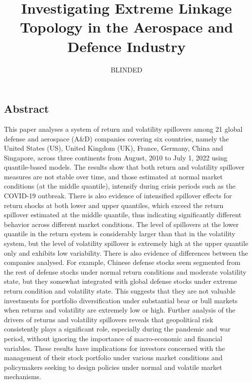 \documentclass[
  number]{elsarticle}
\begin{document}
\begin{frontmatter}
\title{Investigating Extreme Linkage Topology in the Aerospace and
Defence Industry}
\author[]{BLINDED%
%
}




        





\end{frontmatter}
    \ifdefined\Shaded\renewenvironment{Shaded}{\begin{tcolorbox}[sharp corners, enhanced, frame hidden, borderline west={3pt}{0pt}{shadecolor}, interior hidden, breakable, boxrule=0pt]}{\end{tcolorbox}}\fi

\hypertarget{abstract}{%
\subsection*{Abstract}\label{abstract}}

This paper analyses a system of return and volatility spillovers among
21 global defense and aerospace (A\&D) companies covering six countries,
namely the United States (US), United Kingdom (UK), France, Germany,
China and Singapore, across three continents from August, 2010 to July
1, 2022 using quantile-based models. The results show that both return
and volatility spillover measures are not stable over time, and those
estimated at normal market conditions (at the middle quantile),
intensify during crisis periods such as the COVID-19 outbreak. There is
also evidence of intensified spillover effects for return shocks at both
lower and upper quantiles, which exceed the return spillover estimated
at the middle quantile, thus indicating significantly different behavior
across different market conditions. The level of spillovers at the lower
quantile in the return system is considerably larger than that in the
volatility system, but the level of volatility spillover is extremely
high at the upper quantile only and exhibits low variability. There is
also evidence of differences between the companies analysed. For
example, Chinese defense stocks seem segmented from the rest of defense
stocks under normal return conditions and moderate volatility state, but
they somewhat integrated with global defense stocks under extreme return
condition and volatility state. This suggests that they are not valuable
investments for portfolio diversification under substantial bear or bull
markets when returns and volatility are extremely low or high. Further
analysis of the drivers of returns and volatility spillovers reveals
that geopolitical risk consistently plays a significant role, especially
during the pandemic and war period, without ignoring the importance of
macro-economic and financial variables. These results have implications
for investors concerned with the management of their stock portfolio
under various market conditions and policymakers seeking to design
policies under normal and volatile market mechanisms.
\end{document}
